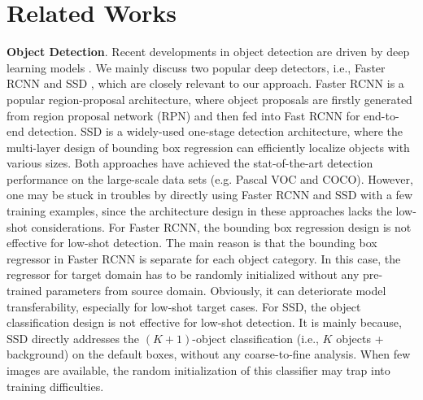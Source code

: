\documentclass[letterpaper]{article} \usepackage{aaai18}  \usepackage{times}  \usepackage{helvet}  \usepackage{courier}  \usepackage{url}  \usepackage{graphicx}
\begin{document}
\section{Related Works}


\textbf{Object Detection}.
Recent developments in object detection are driven by deep learning models \cite{Girshick2014,Girshick2016Fast,ren2015faster,redmon2016you,Liueccv2016,He2017}.
We mainly discuss two popular deep detectors,
i.e.,
Faster RCNN \cite{ren2015faster} and SSD \cite{Liueccv2016},
which are closely relevant to our approach.
Faster RCNN is a popular region-proposal architecture,
where object proposals are firstly generated from region proposal network (RPN) and then fed into Fast RCNN \cite{Girshick2016Fast} for end-to-end detection.
SSD is a widely-used one-stage detection architecture,
where the multi-layer design of bounding box regression can efficiently localize objects with various sizes.
Both approaches have achieved the stat-of-the-art detection performance on the large-scale data sets (e.g. Pascal VOC and COCO).
However,
one may be stuck in troubles by directly using Faster RCNN and SSD with a few training examples,
since the architecture design in these approaches lacks the low-shot considerations.
For Faster RCNN,
the bounding box regression design is not effective for low-shot detection.
The main reason is that the bounding box regressor in Faster RCNN is separate for each object category.
In this case,
the regressor for target domain has to be randomly initialized without any pre-trained parameters from source domain.
Obviously,
it can deteriorate model transferability,
especially for low-shot target cases.
For SSD,
the object classification design is not effective for low-shot detection.
It is mainly because,
SSD directly addresses the $(K+1)$-object classification (i.e., $K$ objects + background) on the default boxes,
without any coarse-to-fine analysis.
When few images are available,
the random initialization of this classifier may trap into training difficulties.
\end{document}
